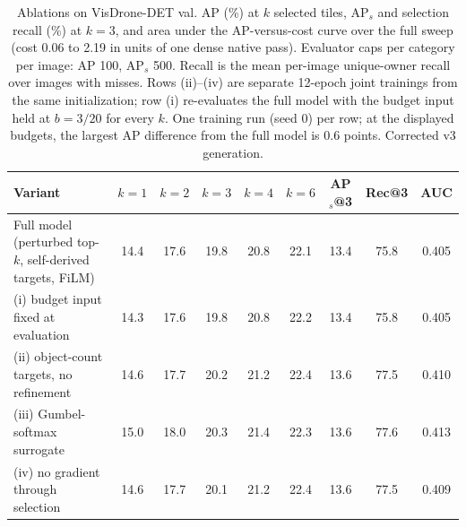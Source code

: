 \begin{table}[t]
\caption{Ablations on VisDrone-DET val. AP (\%) at $k$ selected tiles, AP$_s$ and selection recall (\%) at $k{=}3$, and area under the AP-versus-cost curve over the full sweep (cost 0.06 to 2.19 in units of one dense native pass). Evaluator caps per category per image: AP 100, AP$_s$ 500. Recall is the mean per-image unique-owner recall over images with misses. Rows (ii)--(iv) are separate 12-epoch joint trainings from the same initialization; row (i) re-evaluates the full model with the budget input held at $b{=}3/20$ for every $k$. One training run (seed 0) per row; at the displayed budgets, the largest AP difference from the full model is 0.6 points. Corrected v3 generation.}
\label{tab:ablation}
\centering
\begin{tabular}{lcccccccc}
\toprule
Variant & $k{=}1$ & $k{=}2$ & $k{=}3$ & $k{=}4$ & $k{=}6$ & AP$_s$@3 & Rec@3 & AUC \\
\midrule
Full model (perturbed top-$k$, self-derived targets, FiLM) & 14.4 & 17.6 & 19.8 & 20.8 & 22.1 & 13.4 & 75.8 & 0.405 \\
(i) budget input fixed at evaluation & 14.3 & 17.6 & 19.8 & 20.8 & 22.2 & 13.4 & 75.8 & 0.405 \\
(ii) object-count targets, no refinement & 14.6 & 17.7 & 20.2 & 21.2 & 22.4 & 13.6 & 77.5 & 0.410 \\
(iii) Gumbel-softmax surrogate & 15.0 & 18.0 & 20.3 & 21.4 & 22.3 & 13.6 & 77.6 & 0.413 \\
(iv) no gradient through selection & 14.6 & 17.7 & 20.1 & 21.2 & 22.4 & 13.6 & 77.5 & 0.409 \\
\bottomrule
\end{tabular}
\end{table}

